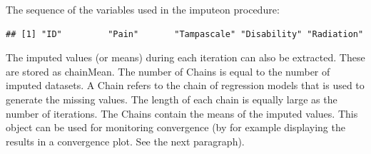 \documentclass[]{book}
\newenvironment{Shaded}{\begin{snugshade}}{\end{snugshade}}
\newcommand{\OperatorTok}[1]{\textcolor[rgb]{0.81,0.36,0.00}{\textbf{#1}}}
\newcommand{\NormalTok}[1]{#1}
\theoremstyle{definition}
\theoremstyle{definition}
\theoremstyle{definition}
\theoremstyle{remark}
\begin{document}
The sequence of the variables used in the imputeon procedure:

\begin{Shaded}
\end{Shaded}

\begin{verbatim}
## [1] "ID"         "Pain"       "Tampascale" "Disability" "Radiation"
\end{verbatim}

The imputed values (or means) during each iteration can also be
extracted. These are stored as chainMean. The number of Chains is equal
to the number of imputed datasets. A Chain refers to the chain of
regression models that is used to generate the missing values. The
length of each chain is equally large as the number of iterations. The
Chains contain the means of the imputed values. This object can be used
for monitoring convergence (by for example displaying the results in a
convergence plot. See the next paragraph).

\begin{Shaded}
\end{Shaded}
\end{document}
